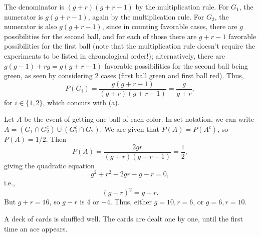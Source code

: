 {\begin{Solution}
{            The denominator is $(g+r)(g+r-1)$ by the multiplication rule. 
            For $G_1$, the numerator is $g(g + r -1)$, again by the multiplication rule. 
            For $G_2$, the numerator is also $g(g + r - 1)$, since in counting favorable cases, there are $g$ possibilities for the second ball, and for each of those there are $g + r - 1$ favorable possibilities for the first ball (note that the multiplication rule doesn't require the experiments to be listed in chronological order!); alternatively, there are $g(g - 1) + rg = g(g + r - 1)$ favorable possibilities for the second ball being green, as seen by considering 2 cases (first ball green and first ball red). 
            Thus, 
            \begin{equation*}
                P(G_i) = \frac{g(g + r - 1)}{(g + r)(g + r -1)} = \frac{g}{g + r}, 
            \end{equation*}
            for $i \in \{ 1, 2 \}$, which concurs with (a). 
            \item 
            Let $A$ be the event of getting one ball of each color. 
            In set notation, we can write $A = (G_1 \cap G_2^c) \cup (G_1^c \cap G_2)$. 
            We are given that $P(A) = P(A^c)$, so $P(A) = 1/2$. 
            Then
            \begin{equation*}
                P(A) = \frac{2gr}{(g + r)(g + r -1)} = \frac{1}{2}, 
            \end{equation*}
            giving the quadratic equation 
            \begin{equation*}
                g^2 + r^2 - 2gr - g - r = 0, 
            \end{equation*}
            i.e., 
            \begin{equation*}
                (g - r)^2 = g + r. 
            \end{equation*}
            But $g + r = 16$, so $g - r$ is 4 or $- 4$. 
            Thus, either $g = 10, r = 6$, or $g = 6, r = 10$. 
        }
    \end{Solution}
    \item%
    \item%
    \item%
    \item%
    A deck of cards is shuffled well. 
    The cards are dealt one by one, until the first time an ace appears. 
    }
